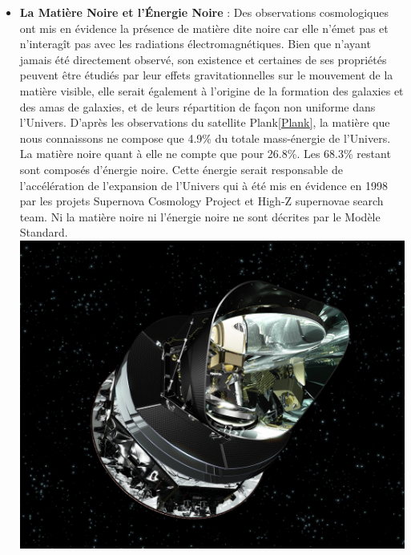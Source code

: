 \begin{itemize}[label=$\bullet$]
\item \textbf{La Matière Noire et l'Énergie Noire} : Des observations cosmologiques ont mis en évidence la présence de matière dite noire car elle n'émet pas et n'interagît pas avec les radiations électromagnétiques. Bien que n'ayant jamais été directement observé, son existence et certaines de ses propriétés peuvent être étudiés par leur effets gravitationnelles sur le mouvement de la matière visible, elle serait  également à l'origine de la formation des galaxies et des amas de galaxies, et de leurs répartition de façon non uniforme dans l'Univers. D'après les observations du satellite Plank\ref{Plank},
la matière que nous connaissons ne compose que 4.9\% du totale mass-énergie de l'Univers. La matière noire quant à elle ne compte que pour 26.8\%. Les 68.3\% restant sont composés d'énergie noire. Cette énergie serait responsable de l'accélération de  l'expansion de l'Univers qui à été mis en évidence en 1998 par les projets Supernova Cosmology Project et High-Z supernovae search team. Ni la matière noire ni l'énergie noire ne sont décrites par le Modèle Standard.
\marginpar
{
\centering
\includegraphics[width=\marginparwidth]{SM/plank.jpg}
\label{Plank}
} 


\end{itemize}
